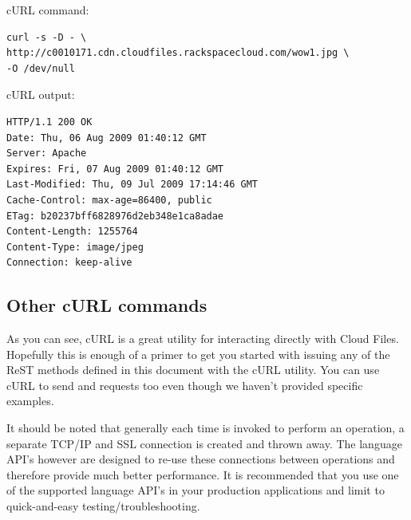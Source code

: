 \documentclass[letterpaper,10pt,english]{manual}
\begin{document}
cURL command:

\begin{Verbatim}[commandchars=@\[\]]
curl -s -D - \
http://c0010171.cdn.cloudfiles.rackspacecloud.com/wow1.jpg \
-O /dev/null
\end{Verbatim}

cURL output:

\begin{Verbatim}[commandchars=@\[\]]
HTTP/1.1 200 OK
Date: Thu, 06 Aug 2009 01:40:12 GMT
Server: Apache
Expires: Fri, 07 Aug 2009 01:40:12 GMT
Last-Modified: Thu, 09 Jul 2009 17:14:46 GMT
Cache-Control: max-age=86400, public
ETag: b20237bff6828976d2eb348e1ca8adae
Content-Length: 1255764
Content-Type: image/jpeg
Connection: keep-alive
\end{Verbatim}


\subsection{Other cURL commands}

As you can see, cURL is a great utility for interacting directly with
Cloud Files.  Hopefully this is enough of a primer to get you started
with issuing any of the ReST methods defined in this document with the
cURL utility.  You can use cURL to send \code{POST} and \code{DELETE} requests
too even though we haven't provided specific examples.

It should be noted that generally each time  is invoked to
perform an operation, a separate TCP/IP and SSL connection is created
and thrown away.  The language API's however are designed to re-use
these connections between operations and therefore provide much better
performance.  It is recommended that you use one of the supported
language API's in your production applications and limit \code{curl} to
quick-and-easy testing/troubleshooting.
\end{document}
